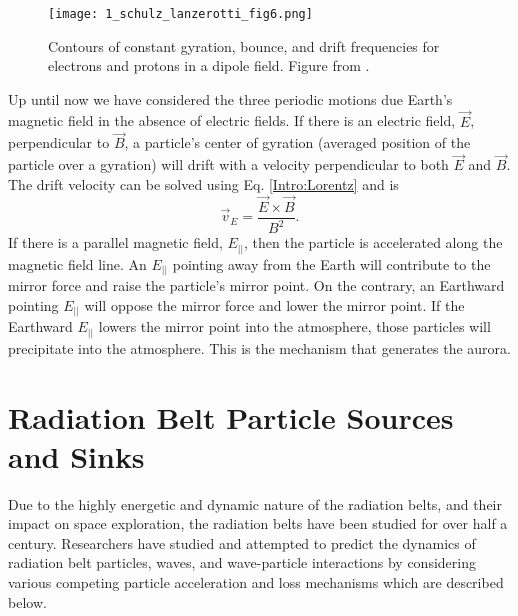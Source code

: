 \begin{figure}
\texttt{[image: 1\_schulz\_lanzerotti\_fig6.png]}
\caption{Contours of constant gyration, bounce, and drift frequencies for electrons and protons in a dipole field. Figure from \citet{Schulz1974}.}
\label{Intro:adiabatic_frequencies}
\end{figure}

Up until now we have considered the three periodic motions due Earth's magnetic field in the absence of electric fields. If there is an electric field, $\vec{E}$, perpendicular to $\vec{B}$, a particle's center of gyration (averaged position of the particle over a gyration) will drift with a velocity perpendicular to both $\vec{E}$ and $\vec{B}$. The drift velocity can be solved using Eq. \ref{Intro:Lorentz} and is
\begin{equation}
\vec{v}_E = \frac{\vec{E} \times \vec{B}}{B^2}.
\end{equation} If there is a parallel magnetic field, $E_{||}$, then the particle is accelerated along the magnetic field line. An $E_{||}$  pointing away from the Earth will contribute to the mirror force and raise the particle's mirror point. On the contrary, an Earthward pointing $E_{||}$ will oppose the mirror force and lower the mirror point. If the Earthward $E_{||}$ lowers the mirror point into the atmosphere, those particles will precipitate into the atmosphere. This is the mechanism that generates the aurora.

\section{Radiation Belt Particle Sources and Sinks}\label{Intro:sources_sinks}
Due to the highly energetic and dynamic nature of the radiation belts, and their impact on space exploration, the radiation belts have been studied for over half a century. Researchers have studied and attempted to predict the dynamics of radiation belt particles, waves, and wave-particle interactions by considering various competing particle acceleration and loss mechanisms which are described below.


